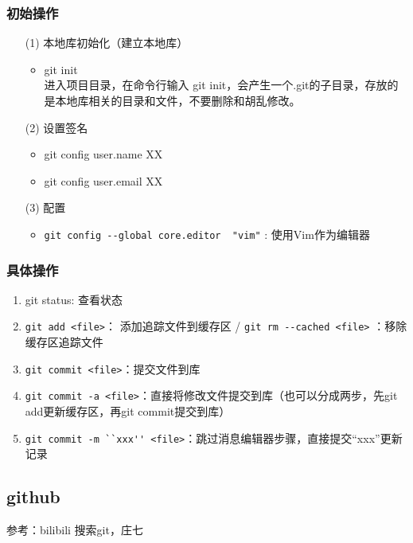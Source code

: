 \documentclass[a4paper,11pt,twoside]{book}
\begin{document}
\subsubsection{初始操作}
\begin{itemize}
\item[(1)] 本地库初始化（建立本地库）
\begin{itemize}
\item git init\\
进入项目目录，在命令行输入 git init，会产生一个.git的子目录，存放的是本地库相关的目录和文件，不要删除和胡乱修改。
\end{itemize}

\item[(2)] 设置签名
\begin{itemize}
\item git config user.name XX
\item git config user.email XX
\end{itemize}

\item [(3)] 配置
\begin{itemize}
\item \verb|git config --global core.editor  "vim"| : 使用Vim作为编辑器
\end{itemize}

\end{itemize}



\subsubsection{具体操作}
\begin{enumerate}
\item git status: 查看状态
\item \verb|git add <file>|： 添加追踪文件到缓存区 / \verb|git rm --cached <file>| ：移除缓存区追踪文件
\item \verb|git commit <file>|：提交文件到库
\item \verb|git commit -a <file>|：直接将修改文件提交到库（也可以分成两步，先git add更新缓存区，再git commit提交到库）
\item \verb|git commit -m ``xxx'' <file>|：跳过消息编辑器步骤，直接提交“xxx”更新记录
\end{enumerate}



\subsection{github}
参考：bilibili 搜索git，庄七
\end{document}
